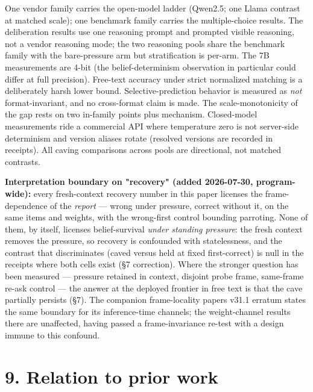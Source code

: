 \documentclass[11pt]{article}
\begin{document}
One vendor family carries the open-model ladder (Qwen2.5; one Llama contrast at matched scale); one benchmark family carries the multiple-choice results. The deliberation results use one reasoning prompt and prompted visible reasoning, not a vendor reasoning mode; the two reasoning pools share the benchmark family with the bare-pressure arm but stratification is per-arm. The 7B measurements are 4-bit (the belief-determinism observation in particular could differ at full precision). Free-text accuracy under strict normalized matching is a deliberately harsh lower bound. Selective-prediction behavior is measured as \emph{not} format-invariant, and no cross-format claim is made. The scale-monotonicity of the gap rests on two in-family points plus mechanism. Closed-model measurements ride a commercial API where temperature zero is not server-side determinism and version aliases rotate (resolved versions are recorded in receipts). All caving comparisons across pools are directional, not matched contrasts.

\textbf{Interpretation boundary on "recovery" (added 2026-07-30, program-wide):} every fresh-context recovery number in this paper licenses the frame-dependence of the \emph{report} --- wrong under pressure, correct without it, on the same items and weights, with the wrong-first control bounding parroting. None of them, by itself, licenses belief-survival \emph{under standing pressure}: the fresh context removes the pressure, so recovery is confounded with statelessness, and the contrast that discriminates (caved versus held at fixed first-correct) is null in the receipts where both cells exist (§7 correction). Where the stronger question has been measured --- pressure retained in context, disjoint probe frame, same-frame re-ask control --- the answer at the deployed frontier in free text is that the cave partially persists (§7). The companion frame-locality paper\textquotesingle s v31.1 erratum states the same boundary for its inference-time channels; the weight-channel results there are unaffected, having passed a frame-invariance re-test with a design immune to this confound.

\section{9. Relation to prior work}\label{9-relation-to-prior-work}
\end{document}
